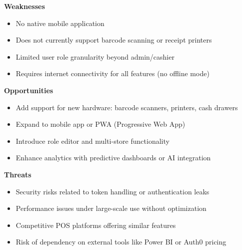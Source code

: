 \textbf{Weaknesses}
\begin{itemize}
  \item No native mobile application
  \item Does not currently support barcode scanning or receipt printers
  \item Limited user role granularity beyond admin/cashier
  \item Requires internet connectivity for all features (no offline mode)
\end{itemize}

\textbf{Opportunities}
\begin{itemize}
  \item Add support for new hardware: barcode scanners, printers, cash drawers
  \item Expand to mobile app or PWA (Progressive Web App)
  \item Introduce role editor and multi-store functionality
  \item Enhance analytics with predictive dashboards or AI integration
\end{itemize}

\textbf{Threats}
\begin{itemize}
  \item Security risks related to token handling or authentication leaks
  \item Performance issues under large-scale use without optimization
  \item Competitive POS platforms offering similar features
  \item Risk of dependency on external tools like Power BI or Auth0 pricing
\end{itemize}
